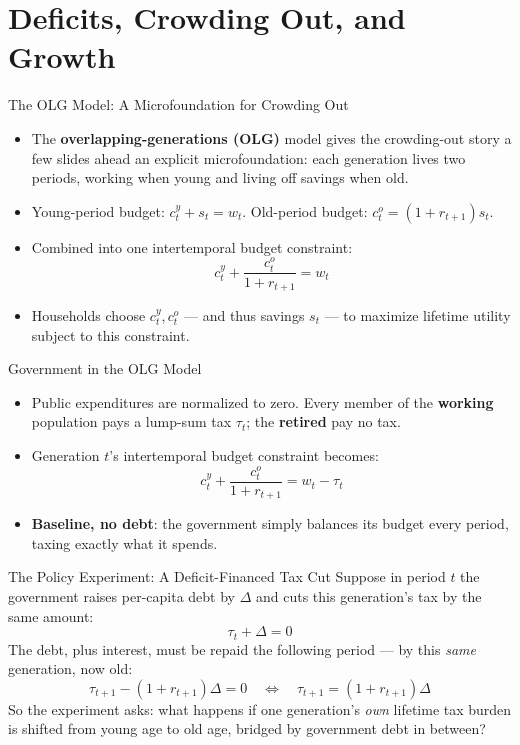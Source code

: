 \documentclass[11pt,aspectratio=169]{beamer}
\begin{document}
\section{Deficits, Crowding Out, and Growth}

\begin{frame}{The OLG Model: A Microfoundation for Crowding Out}
  \small
  \begin{itemize}
    \item The \textbf{overlapping-generations (OLG)} model gives the crowding-out story a few slides ahead an explicit microfoundation: each generation lives two periods, working when young and living off savings when old.
    \item Young-period budget: $c_t^y + s_t = w_t$. Old-period budget: $c_t^o = (1+r_{t+1})s_t$.
    \item Combined into one intertemporal budget constraint:
    \[
      c_t^y + \frac{c_t^o}{1+r_{t+1}} = w_t
    \]
    \item Households choose $c_t^y, c_t^o$ --- and thus savings $s_t$ --- to maximize lifetime utility subject to this constraint.
  \end{itemize}
\end{frame}

\begin{frame}{Government in the OLG Model}
  \small
  \begin{itemize}
    \item Public expenditures are normalized to zero. Every member of the \textbf{working} population pays a lump-sum tax $\tau_t$; the \textbf{retired} pay no tax.
    \item Generation $t$'s intertemporal budget constraint becomes:
    \[
      c_t^y + \frac{c_t^o}{1+r_{t+1}} = w_t - \tau_t
    \]
    \item \textbf{Baseline, no debt}: the government simply balances its budget every period, taxing exactly what it spends.
  \end{itemize}
\end{frame}

\begin{frame}{The Policy Experiment: A Deficit-Financed Tax Cut}
  \small
  Suppose in period $t$ the government raises per-capita debt by $\Delta$ and cuts this generation's tax by the same amount:
  \[
    \tau_t + \Delta = 0
  \]
  The debt, plus interest, must be repaid the following period --- by this \emph{same} generation, now old:
  \[
    \tau_{t+1} - (1+r_{t+1})\Delta = 0 \quad\Longleftrightarrow\quad \tau_{t+1} = (1+r_{t+1})\Delta
  \]
  \vspace{0.3em}
  So the experiment asks: what happens if one generation's \emph{own} lifetime tax burden is shifted from young age to old age, bridged by government debt in between?
\end{frame}
\end{document}
